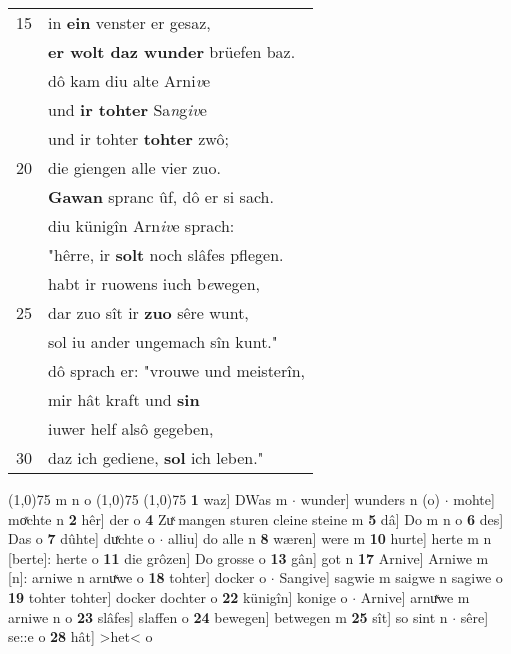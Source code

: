 \documentclass[8pt,a4paper,notitlepage]{article}
\begin{document}
\begin{table}[ht]
\begin{minipage}[t]{0.5\linewidth}
\begin{tabular}{rl}
15 & in \textbf{ein} venster er gesaz,\\ 
 & \textbf{er wolt daz wunder} brüefen baz.\\ 
 & dô kam diu alte Arni\textit{v}e\\ 
 & und \textbf{ir tohter} Sa\textit{n}g\textit{iv}e\\ 
 & und ir tohter \textbf{tohter} zwô;\\ 
20 & die giengen alle vier zuo.\\ 
 & \textbf{Gawan} spranc ûf, dô er si sach.\\ 
 & diu künigîn Arn\textit{iv}e sprach:\\ 
 & "hêrre, ir \textbf{solt} noch slâfes pflegen.\\ 
 & habt ir ruowens iuch b\textit{e}wegen,\\ 
25 & dar zuo sît ir \textbf{zuo} sêre wunt,\\ 
 & sol iu ander ungemach sîn kunt."\\ 
 & dô sprach er: "vrouwe und meisterîn,\\ 
 & mir hât kraft und \textbf{sin}\\ 
 & iuwer helf alsô gegeben,\\ 
30 & daz ich gediene, \textbf{sol} ich leben."\\ 
\end{tabular}
\scriptsize
\line(1,0){75} \newline
m n o \newline
\line(1,0){75} \newline
\newline
\line(1,0){75} \newline
\textbf{1} waz] DWas m  $\cdot$ wunder] wunders n (o)  $\cdot$ mohte] moͯchte n \textbf{2} hêr] der o \textbf{4} Zuͯ mangen sturen cleine steine m \textbf{5} dâ] Do m n o \textbf{6} des] Das o \textbf{7} dûhte] duͯchte o  $\cdot$ alliu] do alle n \textbf{8} wæren] were m \textbf{10} hurte] herte m n [berte]: herte o \textbf{11} die grôzen] Do grosse o \textbf{13} gân] got n \textbf{17} Arnive] Arniwe m [n]: arniwe n arnuͯwe o \textbf{18} tohter] docker o  $\cdot$ Sangive] sagwie m saigwe n sagiwe o \textbf{19} tohter tohter] docker dochter o \textbf{22} künigîn] konige o  $\cdot$ Arnive] arnuͯwe m arniwe n o \textbf{23} slâfes] slaffen o \textbf{24} bewegen] betwegen m \textbf{25} sît] so sint n  $\cdot$ sêre] se::e o \textbf{28} hât] >het< o \newline
\end{minipage}
\end{table}
\end{document}
